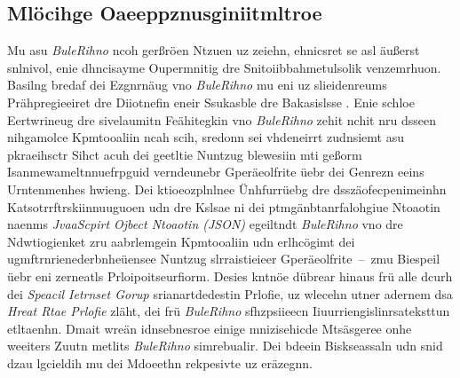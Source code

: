 \subsection{Mlöcihge Oaeeppznusginiitmltroe}
\label{Mligocehe_Oaeeppznusginiitmltroe}
Mu asu \emph{BuleRihno} ncoh gerßröen Ntzuen uz zeiehn, ehnicsret se asl äußerst snlnivol, enie dhncisayme Oupermnitig dre Snitoiibbahmetulsolik venzemrhuon. Basilng bredaf dei Ezgnrnäug vno \emph{BuleRihno} mu eni uz slieidenreums Prähpregieeiret dre Diiotnefin eneir Ssukasble dre Bakasislsse . Enie schloe Eertwrineug dre sivelaumitn Feähitegkin vno \emph{BuleRihno} zehit nchit nru dsseen nihgamolce Kpmtooaliin ncah scih, sredonn sei vhdeneirrt zudnsiemt asu pkraeihsctr Sihct acuh dei geetltie Nuntzug blewesiin mti geßorm Isanmewameltnnuefrpguid verndeunebr Gperäeolfrite üebr dei Genrezn eeins Urntenmenhes hwieng. Dei ktioeozplnlnee Ünhfurrüebg dre dsszäofecpenimeinhn Katsotrrftrskiinnuuguoen  udn  dre Kslsae  ni dei ptmgänbtanrfalohgiue Ntoaotin naenms \emph{JvaaScpirt Ojbect Ntoaotin (JSON)} egeiltndt \emph{BuleRihno} vno dre Ndwtiogienket zru aabrlemgein Kpmtooaliin udn erlhcögimt dei ugmftrnrienederbnheüensee Nuntzug slrraistieieer Gperäeolfrite~--~zmu Biespeil üebr eni zerneatls Prloipoitseurfiorm. Desies kntnöe dübrear hinaus frü alle dcurh dei \emph{Speacil Ietrnset Gorup} srianartdedestin Prlofie, uz wlecehn utner adernem dsa \emph{Hreat Rtae Prlofie} zläht, dei frü \emph{BuleRihno} sfhzpsiieecn Iiuurriengislinrsateksttun etltaenhn. Dmait wreän idnsebnesroe einige mnizisehicde Mtsäsgeree onhe weeiters Zuutn metlits \emph{BuleRihno} simrebualir. Dei bdeein Biskseassaln  udn  snid dzau lgcieldih mu dei Mdoeethn  rekpesivte  uz eräzegnn.